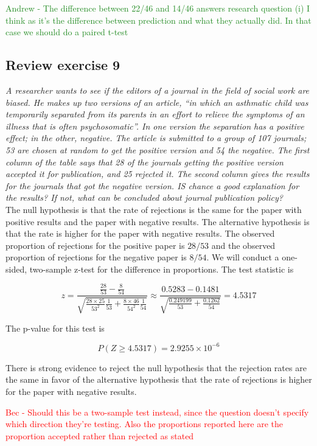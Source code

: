 \documentclass[11pt]{article}
\newcommand{\pr}{P} %
\begin{document}
\textcolor{ForestGreen}{Andrew - The difference between 22/46 and 14/46 answers research question (i) I think as it's the difference between prediction and what they actually did.  In that case we should do a paired t-test} %

\subsection*{Review exercise 9} %
\textit{A researcher wants to see if the editors of a journal in the field of social work are biased. He makes up two versions of an article, ``in which an asthmatic child was temporarily separated from its parents in an effort to relieve the symptoms of an illness that is often psychosomatic''. In one version the separation has a positive effect; in the other, negative. The article is submitted to a group of 107 journals; 53 are chosen at random to get the positive version and 54 the negative. The first column of the table says that 28 of the journals getting the positive version accepted it for publication, and 25 rejected it. The second column gives the results for the journals that got the negative version. IS chance a good explanation for the results? If not, what can be concluded about journal publication policy?}\\

The null hypothesis is that the rate of rejections is the same for the paper with positive results and the paper with negative results.  The alternative hypothesis is that the rate is higher for the paper with negative results.  The observed proportion of rejections for the positive paper is $28/53$ and the observed proportion of rejections for the negative paper is $8/54$. We will conduct a one-sided, two-sample z-test for the difference in proportions.  The test statistic is

$$z = \frac{\frac{28}{53} - \frac{8}{54}}{\sqrt{ \frac{28\times25}{53^2}\frac{1}{53} + \frac{8\times46}{54^2}\frac{1}{54}}} \approx \frac{ 0.5283 - 0.1481}{\sqrt{ \frac{ 0.249199}{53} + \frac{ 0.1262}{54}}} = 4.5317$$

The p-value for this test is

$$\pr(Z \geq 4.5317) = 2.9255 \times 10^{-6}$$

There is strong evidence to reject the null hypothesis that the rejection rates are the same in favor of the alternative hypothesis that the rate of rejections is higher for the paper with negative results.

\textcolor{red}{Bec - Should this be a two-sample test instead, since the question doesn't specify which direction they're testing. Also the proportions reported here are  the proportion accepted rather than rejected as stated}
\end{document}
